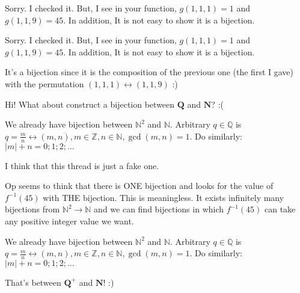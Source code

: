 \begin{solution}
	Sorry. I checked it. But, I see in your function, $g(1,1,1)=1$ and  $g(1,1,9)=45$. In addition, It is not easy to show it is a bijection.
\end{solution}



\begin{solution}
	\begin{tcolorbox}Sorry. I checked it. But, I see in your function, $g(1,1,1)=1$ and  $g(1,1,9)=45$. In addition, It is not easy to show it is a bijection.\end{tcolorbox}
It's a bijection since it is the composition of the previous one (the first I gave) with the permutation $(1,1,1)\leftrightarrow(1,1,9)$ :)
\end{solution}



\begin{solution}
	\begin{tcolorbox}Hi!
What about construct a bijection between $\mathbf{Q}$ and $\mathbf{N}$? :(\end{tcolorbox}
We already have bijection between $\mathbb{N}^2$ and $\mathbb{N}$. Arbitrary $q \in \mathbb{Q}$ is $q=\frac{m}{n} \leftrightarrow (m,n), m \in \mathbb{Z}, n \in \mathbb{N}, \gcd (m,n)=1$. Do similarly: $|m|+n=0;1;2;...$
\end{solution}



\begin{solution}
	I think that this thread is just a fake one.

Op seems to think that there is ONE bijection and looks for the value of $f^{-1}(45)$ with THE bijection.
This is meaningless.
It exists infinitely many bijections from $\mathbb N^2\to\mathbb N$ and we can find bijections in which $f^{-1}(45)$ can take any positive integer value we want.
\end{solution}



\begin{solution}
	\begin{tcolorbox}
We already have bijection between $\mathbb{N}^2$ and $\mathbb{N}$. Arbitrary $q \in \mathbb{Q}$ is $q=\frac{m}{n} \leftrightarrow (m,n), m \in \mathbb{Z}, n \in \mathbb{N}, \gcd (m,n)=1$. Do similarly: $|m|+n=0;1;2;...$\end{tcolorbox}

That's between $\mathbf{Q}^+$ and $\mathbf{N}$! :)
\end{solution}



